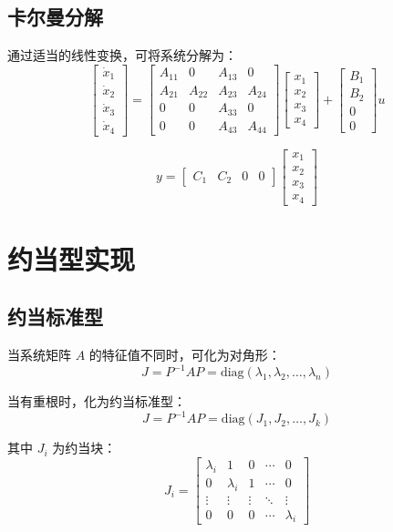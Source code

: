 \documentclass[12pt,a4paper]{article}
\begin{document}
\subsection{卡尔曼分解}
通过适当的线性变换，可将系统分解为：
\[\begin{bmatrix} \dot{x}_1 \\ \dot{x}_2 \\ \dot{x}_3 \\ \dot{x}_4 \end{bmatrix} = 
\begin{bmatrix}
A_{11} & 0 & A_{13} & 0 \\
A_{21} & A_{22} & A_{23} & A_{24} \\
0 & 0 & A_{33} & 0 \\
0 & 0 & A_{43} & A_{44}
\end{bmatrix}
\begin{bmatrix} x_1 \\ x_2 \\ x_3 \\ x_4 \end{bmatrix} +
\begin{bmatrix} B_1 \\ B_2 \\ 0 \\ 0 \end{bmatrix} u\]

\[y = \begin{bmatrix} C_1 & C_2 & 0 & 0 \end{bmatrix} \begin{bmatrix} x_1 \\ x_2 \\ x_3 \\ x_4 \end{bmatrix}\]

\section{约当型实现}

\subsection{约当标准型}
当系统矩阵 $A$ 的特征值不同时，可化为对角形：
\[J = P^{-1}AP = \text{diag}(\lambda_1, \lambda_2, \ldots, \lambda_n)\]

当有重根时，化为约当标准型：
\[J = P^{-1}AP = \text{diag}(J_1, J_2, \ldots, J_k)\]

其中 $J_i$ 为约当块：
\[J_i = \begin{bmatrix}
\lambda_i & 1 & 0 & \cdots & 0 \\
0 & \lambda_i & 1 & \cdots & 0 \\
\vdots & \vdots & \vdots & \ddots & \vdots \\
0 & 0 & 0 & \cdots & \lambda_i
\end{bmatrix}\]
\end{document}
